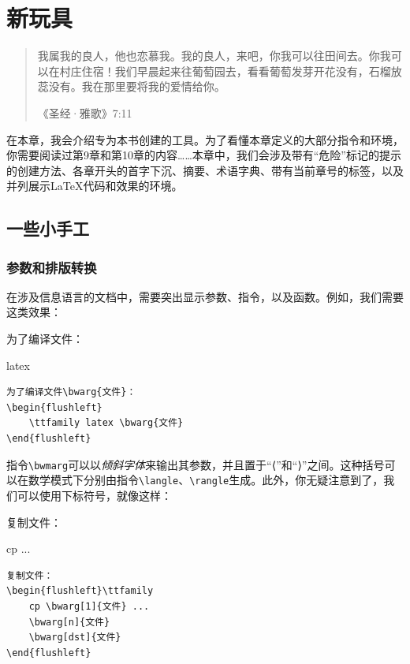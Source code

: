 \chapter{新玩具}

\begin{quote}
    我属我的良人，他也恋慕我。我的良人，来吧，你我可以往田间去。你我可以在村庄住宿！我们早晨起来往葡萄园去，看看葡萄发芽开花没有，石榴放蕊没有。我在那里要将我的爱情给你。

    \hfill《圣经·雅歌》7:11
\end{quote}

在本章，我会介绍专为本书创建的工具。为了看懂本章定义的大部分指令和环境，你需要阅读过第9章和第10章的内容……本章中，我们会涉及带有“危险”标记的提示的创建方法、各章开头的首字下沉、摘要、术语字典、带有当前章号的标签，以及并列展示\LaTeX 代码和效果的环境。

\section{一些小手工}

\subsection{参数和排版转换}

在涉及信息语言的文档中，需要突出显示参数、指令，以及函数。例如，我们需要这类效果：

\begin{codelist}[11.1]{
    为了编译文件：
\begin{flushleft}
    \ttfamily latex 
\end{flushleft}
}\begin{verbatim}
为了编译文件\bwarg{文件}：
\begin{flushleft}
    \ttfamily latex \bwarg{文件}
\end{flushleft}
\end{verbatim}
\end{codelist}

指令\verb|\bwmarg|可以以\textsl{倾斜字体}来输出其参数，并且置于“⟨”和“⟩”之间。这种括号可以在数学模式下分别由指令\verb|\langle|、\verb|\rangle|生成。此外，你无疑注意到了，我们可以使用下标符号，就像这样：

\begin{codelist}[11.2]{
复制文件：
\begin{flushleft}\ttfamily
    cp  ...
\end{flushleft} 
}\begin{verbatim}
复制文件：
\begin{flushleft}\ttfamily
    cp \bwarg[1]{文件} ...
    \bwarg[n]{文件}
    \bwarg[dst]{文件}
\end{flushleft}
\end{verbatim}
\end{codelist}

